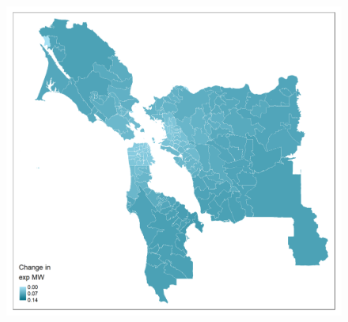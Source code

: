 \documentclass[aspectratio=169, t]{beamer}
\begin{document}
\begin{frame}[label = bay_example]
\begin{columns}
\begin{column}{0.50\textwidth}
\begin{figure}
                \includegraphics[scale = 0.36]{maps_events/output/bay_area2018-12_exp_mw.png}
            \end{figure}   
        \end{column}
    \end{columns}
    \hyperlink{chi_example}{}
\end{frame}
\end{document}
